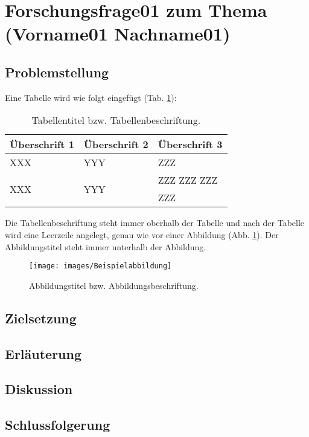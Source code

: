 \section{Forschungsfrage01 zum Thema (Vorname01 Nachname01)}

\subsection{Problemstellung}

Eine Tabelle wird wie folgt eingefügt (Tab. \ref{tab:Beispieltabelle}):

\begin{table}[H]
	\caption{Tabellentitel bzw. Tabellenbeschriftung.}	
	\begin{tabularx}{1\textwidth}{|l|p{}|X|}\hline
		Überschrift 1 & Überschrift 2 & Überschrift 3\\
		\hline\hline
		XXX & YYY & ZZZ\\
		\hline
		\multirow{4}{*}{XXX}
			& \multirow{3}{*}{YYY} & ZZZ \newline ZZZ \newline ZZZ\\ 
			\cline{2-3}
			& YYY & ZZZ\\
		\hline
	\end{tabularx}
	\label{tab:Beispieltabelle}
\end{table}

Die Tabellenbeschriftung steht immer oberhalb der Tabelle und nach der Tabelle wird eine Leerzeile angelegt, genau wie vor einer Abbildung (Abb. \ref{fig:Beispielabbildung}). Der Abbildungstitel steht immer unterhalb der Abbildung.

\begin{figure}[H]
	\centering
	\texttt{[image: images/Beispielabbildung]}
	\caption{Abbildungstitel bzw. Abbildungsbeschriftung.}
	\label{fig:Beispielabbildung}
\end{figure}

\subsection{Zielsetzung}

\subsection{Erläuterung}

\subsection{Diskussion}

\subsection{Schlussfolgerung}
